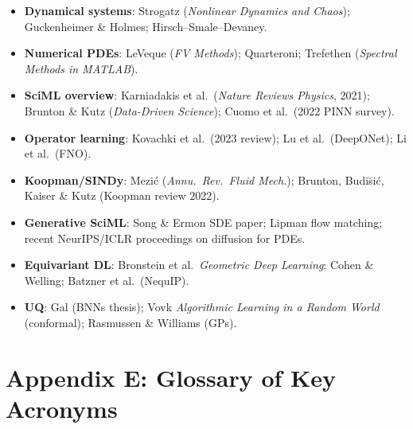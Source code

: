 \begin{itemize}
\item \textbf{Dynamical systems}: Strogatz (\emph{Nonlinear Dynamics and
Chaos}); Guckenheimer \& Holmes; Hirsch--Smale--Devaney.
\item \textbf{Numerical PDEs}: LeVeque (\emph{FV Methods}); Quarteroni;
Trefethen (\emph{Spectral Methods in MATLAB}).
\item \textbf{SciML overview}: Karniadakis et al.\ (\emph{Nature Reviews
Physics}, 2021); Brunton \& Kutz (\emph{Data-Driven Science}); Cuomo et al.\
(2022 PINN survey).
\item \textbf{Operator learning}: Kovachki et al.\ (2023 review); Lu et
al.\ (DeepONet); Li et al.\ (FNO).
\item \textbf{Koopman/SINDy}: Mezi\'c (\emph{Annu.\ Rev.\ Fluid Mech.});
Brunton, Budi\u{s}i\'c, Kaiser \& Kutz (Koopman review 2022).
\item \textbf{Generative SciML}: Song \& Ermon SDE paper; Lipman flow
matching; recent NeurIPS/ICLR proceedings on diffusion for PDEs.
\item \textbf{Equivariant DL}: Bronstein et al.\ \emph{Geometric Deep
Learning}; Cohen \& Welling; Batzner et al.\ (NequIP).
\item \textbf{UQ}: Gal (BNNs thesis); Vovk \emph{Algorithmic Learning in
a Random World} (conformal); Rasmussen \& Williams (GPs).
\end{itemize}

\section*{Appendix E: Glossary of Key Acronyms}

